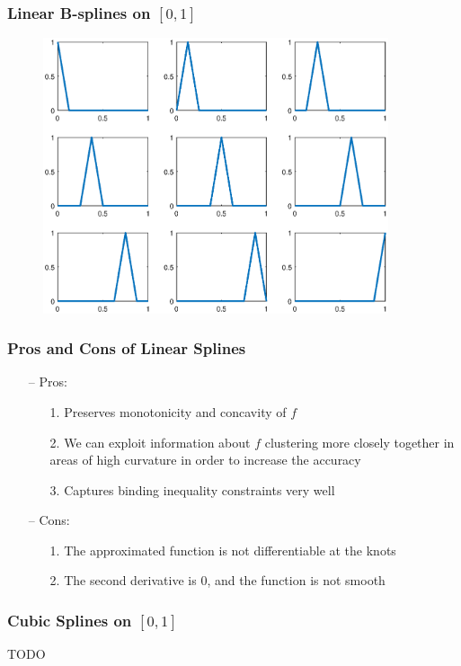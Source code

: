 \documentclass[aspectratio=169, 11pt]{beamer}
\begin{document}
\begin{frame}
\frametitle{Linear B-splines on $\left[0, 1\right]$}
  \begin{figure}
    \centering
    \includegraphics[width = 4in]{linear_spline.eps}
  \end{figure}
\end{frame}

\begin{frame}
\frametitle{Pros and Cons of Linear Splines}
  \begin{itemize}
    \item[--] Pros:
    \begin{itemize}
      \item[1.] Preserves monotonicity and concavity of $f$
      \item[2.] We can exploit information about $f$ clustering more closely together in areas of high curvature in order to increase the accuracy
      \item[3.] Captures binding inequality constraints very well
    \end{itemize}
    \bigskip
    \item[--] Cons:
    \begin{itemize}
      \item[1.] The approximated function is not differentiable at the knots
      \item[2.] The second derivative is 0, and the function is not smooth
    \end{itemize}
  \end{itemize}
\end{frame}

\begin{frame}
\frametitle{Cubic Splines on $\left[0, 1\right]$}
TODO
\end{frame}
\end{document}
